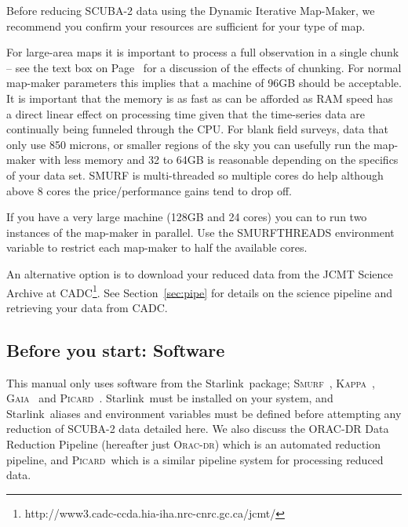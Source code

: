 \documentclass[twoside,11pt]{article}
\newcommand{\htmladdnormallink}[2]{#1}
\newcommand{\xref}[3]{#1}
\newcommand{\xlabel}[1]{}
\renewcommand{\_}{\texttt{\symbol{95}}}
\newcommand{\starlink}{\htmladdnormallink{Starlink}{http://starlink.jach.hawaii.edu}}
\newcommand{\gaia}{\xref{\textsc{Gaia}}{sun214}{}}
\newcommand{\Kappa}{\xref{\textsc{Kappa}}{sun95}{}}
\newcommand{\oracdr}{\htmladdnormallink{\textsc{Orac-dr}}{http://www.oracdr.org/oracdr}}
\newcommand{\picard}{\xref{\textsc{Picard}}{sun265}{}}
\newcommand{\smurf}{\xref{\textsc{Smurf}}{sun258}{}}
\begin{document}
Before reducing SCUBA-2 data using the Dynamic Iterative Map-Maker, we
recommend you confirm your resources are sufficient for your type of
map.

For large-area maps it is important to process a full observation in a
single chunk -- see the text box on Page~\pageref{page:text} for a
discussion of the effects of chunking. For normal map-maker parameters
this implies that a machine of 96GB should be acceptable. It is
important that the memory is as fast as can be afforded as RAM speed
has a direct linear effect on processing time given that the
time-series data are continually being funneled through the CPU.  For
blank field surveys, data that only use 850 microns, or smaller
regions of the sky you can usefully run the map-maker with less memory
and 32 to 64GB is reasonable depending on the specifics of your data
set. SMURF is multi-threaded so multiple cores do help although above
8 cores the price/performance gains tend to drop off.

If you have a very large machine (128GB and 24 cores) you can to run
two instances of the map-maker in parallel. Use the SMURF\_THREADS
environment variable to restrict each map-maker to half the available
cores.

An alternative option is to download your reduced data from the JCMT
Science Archive at
CADC\footnote{http://www3.cadc-ccda.hia-iha.nrc-cnrc.gc.ca/jcmt/}. See
Section~\ref{sec:pipe} for details on the science pipeline and
retrieving your data from CADC.

\subsection{\xlabel{software}Before you start: Software}

This manual only uses software from the \starlink\ package;
\smurf\ \cite{smurf}, \Kappa\ \cite{kappa}, \gaia\ \cite{gaia} and
\picard\ \cite{picard}.
\starlink\ must be installed on your system, and \starlink\ aliases
and environment variables must be defined before attempting any
reduction of SCUBA-2 data detailed here. We also discuss the ORAC-DR
Data Reduction Pipeline\cite{oracdr} (hereafter just \oracdr) which is
an automated reduction pipeline, and \picard\ which is a similar
pipeline system for processing reduced data.
\end{document}
